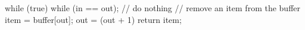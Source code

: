 \documentclass[varwidth=19em,crop]{standalone}
\begin{document}
\begin{ccode}
while (true) {
  while (in == out); // do nothing
  // remove an item from the buffer
  item = buffer[out];
  out = (out + 1) %
  return item;
}
\end{ccode}
\end{document}
